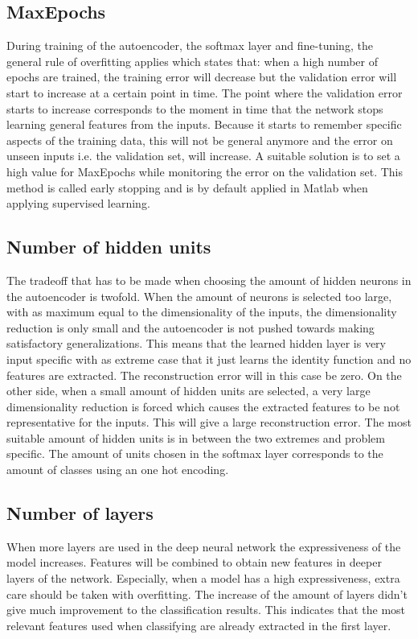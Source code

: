 \documentclass[a4paper,10pt]{article}
\begin{document}
\subsection{MaxEpochs}
During training of the autoencoder, the softmax layer and fine-tuning, the general rule of overfitting applies which states that: when a high number of epochs are trained, the training error will decrease but the validation error will start to increase at a certain point in time. The point where the validation error starts to increase corresponds to the moment in time that the network stops learning general features from the inputs. Because it starts to remember specific aspects of the training data, this will not be general anymore and the error on unseen inputs i.e. the validation set, will increase. A suitable solution is to set a high value for MaxEpochs while monitoring the error on the validation set. This method is called early stopping and is by default applied in Matlab when applying supervised learning. 

\subsection{Number of hidden units}
The tradeoff that has to be made when choosing the amount of hidden neurons in the autoencoder is twofold. When the amount of neurons is selected too large, with as maximum equal to the dimensionality of the inputs, the dimensionality reduction is only small and the autoencoder is not pushed towards making satisfactory generalizations. This means that the learned hidden layer is very input specific with as extreme case that it just learns the identity function and no features are extracted. The reconstruction error will in this case be zero. On the other side, when a small amount of hidden units are selected, a very large dimensionality reduction is forced which causes the extracted features to be not representative for the inputs. This will give a large reconstruction error. The most suitable amount of hidden units is in between the two extremes and problem specific. The amount of units chosen in the softmax layer corresponds to the amount of classes using an one hot encoding.

\subsection{Number of layers}
When more layers are used in the deep neural network the expressiveness of the model increases. Features will be combined to obtain new features in deeper layers of the network. Especially, when a model has a high expressiveness, extra care should be taken with overfitting. The increase of the amount of layers didn't give much improvement to the classification results. This indicates that the most relevant features used when classifying are already extracted in the first layer.\\ 
\end{document}
